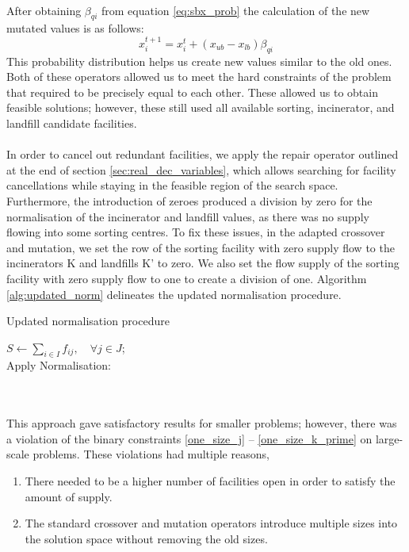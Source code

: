 \documentclass[mscthesis, 11pt]{usiinfthesis}
\theoremstyle{newdefinition}
\begin{document}
\\
After obtaining $\beta_{qi}$ from equation \ref{eq:sbx_prob} the calculation of the new mutated values is as follows:
\begin{equation}
    x_i^{t+1} = x_i^t + (x_{ub} - x_{lb})\beta_{qi}
\end{equation}
This probability distribution helps us create new values similar to the old ones.
Both of these operators allowed us to meet the hard constraints of the problem that required to be precisely equal to each other. These allowed us to obtain feasible solutions; however, these still used all available sorting, incinerator, and landfill candidate facilities.
\\\\
In order to cancel out redundant facilities, we apply the repair operator outlined at the end of section \ref{sec:real_dec_variables}, which allows searching for facility cancellations while staying in the feasible region of the search space. 
\\
Furthermore, the introduction of zeroes produced a division by zero for the normalisation of the incinerator and landfill values, as there was no supply flowing into some sorting centres. To fix these issues, in the adapted crossover and mutation, we set the row of the sorting facility with zero supply flow to the incinerators K and landfills K' to zero. We also set the flow supply of the sorting facility with zero supply flow to one to create a division of one. Algorithm \ref{alg:updated_norm} delineates the updated normalisation procedure.
\begin{algorithm}[ht]
    \caption{Updated normalisation procedure}\label{alg:updated_norm}
    $S \gets \sum_{i \in I} f_{ij}, \quad \forall j \in J$;\\
    Apply Normalisation:\\
\end{algorithm} 
\\\\
This approach gave satisfactory results for smaller problems; however, there was a violation of the binary constraints \ref{one_size_j} -- \ref{one_size_k_prime}  on large-scale problems. These violations had multiple reasons,
\begin{enumerate}
    \item There needed to be a higher number of facilities open in order to satisfy the amount of supply.
    \item The standard crossover and mutation operators introduce multiple sizes into the solution space without removing the old sizes.
\end{enumerate}
\end{document}
